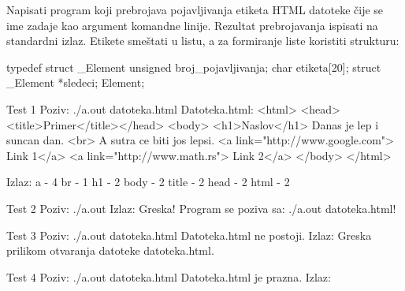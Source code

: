 \begin{Exercise}[label=607]
Napisati program koji prebrojava pojavljivanja etiketa HTML 
datoteke čije se ime zadaje kao argument komandne linije. Rezultat prebrojavanja 
ispisati na standardni izlaz. Etikete smeštati u listu, a za formiranje liste koristiti strukturu:
\begin{ckod} 
 typedef struct _Element
 {
   unsigned broj_pojavljivanja;
   char etiketa[20];
   struct _Element *sledeci;
 } Element;
\end{ckod}
\begin{maxitest}
\begin{test}{Test 1}
Poziv: ./a.out datoteka.html
Datoteka.html:                                     
<html>                                             
  <head><title>Primer</title></head>               
  <body>                                           
    <h1>Naslov</h1>                                
    Danas je lep i suncan dan. <br>                
    A sutra ce biti jos lepsi.                     
    <a link="http://www.google.com"> Link 1</a>    
    <a link="http://www.math.rs"> Link 2</a>
  </body>
</html>

Izlaz:  
  a - 4
  br - 1
  h1 - 2
  body - 2
  title - 2
  head - 2
  html - 2
\end{test}
\end{maxitest}
\begin{maxitest}
\begin{test}{Test 2}
Poziv: ./a.out 
Izlaz: 
  Greska! Program se poziva sa: ./a.out datoteka.html!
\end{test}
\end{maxitest}
\begin{maxitest}
\begin{test}{Test 3}
Poziv: ./a.out datoteka.html
Datoteka.html ne postoji.
Izlaz: 
  Greska prilikom otvaranja datoteke datoteka.html.
\end{test}
\end{maxitest}
\begin{maxitest}
\begin{test}{Test 4}
Poziv: ./a.out datoteka.html
Datoteka.html je prazna.
Izlaz: 
\end{test}
\end{maxitest}
\end{Exercise}
\begin{Answer}[ref=607]
\end{Answer}

